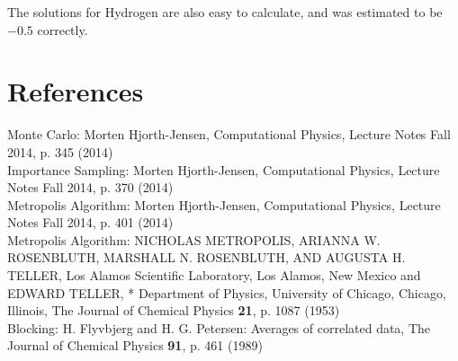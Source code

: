 \documentclass[twocolumn]{article}[10pt]
\begin{document}
The solutions for Hydrogen are also easy to calculate, and was estimated
to be $-0.5$ correctly.

\section{References}

\noindent Monte Carlo: Morten Hjorth-Jensen, Computational Physics, Lecture Notes Fall 2014, p. 345 (2014)\\

\noindent Importance Sampling: Morten Hjorth-Jensen, Computational Physics, Lecture Notes Fall 2014, p. 370 (2014)\\

\noindent Metropolis Algorithm: Morten Hjorth-Jensen, Computational Physics, Lecture Notes Fall 2014, p. 401 (2014)\\

\noindent Metropolis Algorithm: NICHOLAS
METROPOLIS,
ARIANNA
W.
ROSENBLUTH,
MARSHALL
N.
ROSENBLUTH,
AND
AUGUSTA
H.
TELLER,
Los
Alamos
Scientific
Laboratory,
Los
Alamos,
New
Mexico and EDWARD
TELLER,
*
Department
of
Physics,
University
of
Chicago, Chicago,
Illinois, The Journal of Chemical Physics \textbf{21}, p. 1087 (1953)\\

\noindent Blocking: H. Flyvbjerg and H. G. Petersen: Averages of correlated data, The Journal of Chemical Physics \textbf{91}, p. 461 (1989)
\end{document}
